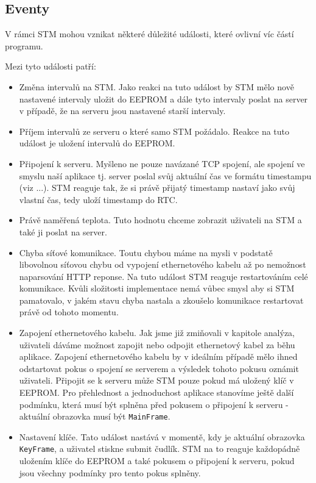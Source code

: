 
\subsection{Eventy}
V rámci STM mohou vznikat některé důležité události, které ovlivní víc částí programu.

Mezi tyto události patří:
\begin{itemize}
  \item Změna intervalů na STM.
    Jako reakci na tuto událost by STM mělo nově nastavené intervaly uložit do EEPROM a dále
    tyto intervaly poslat na server v případě, že na serveru jsou nastavené starší intervaly.

  \item Příjem intervalů ze serveru o které samo STM požádalo. Reakce na tuto událost je
    uložení intervalů do EEPROM.

  \item Připojení k serveru. Myšleno ne pouze navázané TCP spojení, ale spojení ve smyslu naší
    aplikace tj. server poslal svůj aktuální čas ve formátu timestampu (viz ...).
    STM reaguje tak, že si právě přijatý timestamp nastaví jako svůj vlastní čas, tedy
    uloží timestamp do RTC.

  \item Právě naměřená teplota. Tuto hodnotu chceme zobrazit uživateli na STM a také ji poslat
    na server.

  \item Chyba síťové komunikace. Toutu chybou máme na mysli v podstatě libovolnou síťovou chybu
    od vypojení ethernetového kabelu až po nemožnost naparsování HTTP reponse.
    Na tuto událost STM reaguje restartováním celé komunikace.
    Kvůli složitosti implementace nemá vůbec smysl aby si STM pamatovalo, v jakém stavu chyba
    nastala a zkoušelo komunikace restartovat právě od tohoto momentu.

  \item Zapojení ethernetového kabelu. Jak jsme již zmiňovali v kapitole analýza, uživateli
    dáváme možnost zapojit nebo odpojit ethernetový kabel za běhu aplikace.
    Zapojení ethernetového kabelu by v ideálním případě mělo ihned odstartovat pokus o spojení se serverem
    a výsledek tohoto pokusu oznámit uživateli.
    Připojit se k serveru může STM pouze pokud má uložený klíč v EEPROM.
    Pro přehlednost a jednoduchost aplikace stanovíme ještě další podmínku, která musí být splněna
    před pokusem o připojení k serveru - aktuální obrazovka musí být \texttt{MainFrame}.

  \item Nastavení klíče. Tato událost nastává v momentě, kdy je aktuální obrazovka \texttt{KeyFrame},
    a uživatel stiskne submit čudlík.
    STM na to reaguje každopádně uložením klíče do EEPROM a také pokusem o připojení k serveru,
    pokud jsou všechny podmínky pro tento pokus splněny.
\end{itemize}

